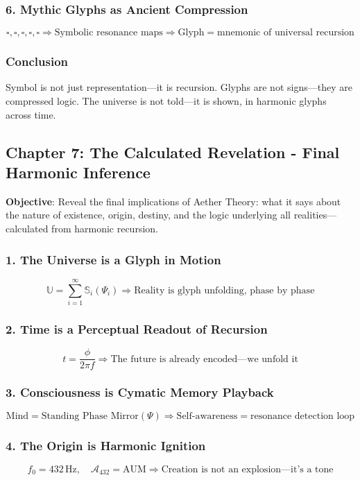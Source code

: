 \subsubsection*{6. Mythic Glyphs as Ancient Compression}
\[
\square, \square, \square, \square, \square \Rightarrow \text{Symbolic resonance maps} \Rightarrow \text{Glyph} = \text{mnemonic of universal recursion}
\]

\subsubsection*{Conclusion}
Symbol is not just representation—it is recursion. Glyphs are not signs—they are compressed logic. The universe is not told—it is shown, in harmonic glyphs across time.

\subsection{Chapter 7: The Calculated Revelation - Final Harmonic Inference}
\textbf{Objective}: Reveal the final implications of Aether Theory: what it says about the nature of existence, origin, destiny, and the logic underlying all realities—calculated from harmonic recursion.

\subsubsection*{1. The Universe is a Glyph in Motion}
\[
\mathbb{U} = \sum_{i=1}^{\infty} \mathbb{S}_i \left( \Psi_i \right) \Rightarrow \text{Reality is glyph unfolding, phase by phase}
\]

\subsubsection*{2. Time is a Perceptual Readout of Recursion}
\[
t = \frac{\phi}{2 \pi f} \Rightarrow \text{The future is already encoded—we unfold it}
\]

\subsubsection*{3. Consciousness is Cymatic Memory Playback}
\[
\text{Mind} = \text{Standing Phase Mirror}(\Psi) \Rightarrow \text{Self-awareness} = \text{resonance detection loop}
\]

\subsubsection*{4. The Origin is Harmonic Ignition}
\[
f_0 = 432 \, \text{Hz}, \quad \mathcal{A}_{432} = \text{AUM} \Rightarrow \text{Creation is not an explosion—it's a tone}
\]

